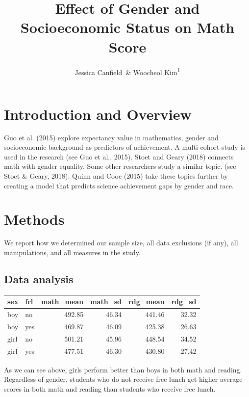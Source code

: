 \documentclass[man, fleqn, noextraspace,floatsintext]{apa6}
\title{Effect of Gender and Socioeconomic Status on Math Score}
\author{Jessica Canfield~\& Woocheol Kim\textsuperscript{1}}
\date{}
\affiliation{
\vspace{0.5cm}
\textsuperscript{1} University of Oregon}
\begin{document}
\maketitle

\hypertarget{introduction-and-overview}{%
\section{Introduction and Overview}\label{introduction-and-overview}}

Guo et al. (2015) explore expectancy value in mathematics, gender and socioeconomic background as predictors of achievement. A multi-cohort study is used in the research (see Guo et al., 2015). Stoet and Geary (2018) connects math with gender equality. Some other researchers study a similar topic. (see Stoet \& Geary, 2018). Quinn and Cooc (2015) take these topics further by creating a model that predicts science achievement gaps by gender and race.

\hypertarget{methods}{%
\section{Methods}\label{methods}}

We report how we determined our sample size, all data exclusions (if any), all manipulations, and all measures in the study.

\hypertarget{data-analysis}{%
\subsection{Data analysis}\label{data-analysis}}

\begin{table}[H]
\centering\begingroup\fontsize{15}{17}\selectfont

\begin{tabular}{l|l|r|r|r|r}
\hline
sex & frl & math\_mean & math\_sd & rdg\_mean & rdg\_sd\\
\hline
boy & no & 492.85 & 46.34 & 441.46 & 32.32\\
\hline
boy & yes & 469.87 & 46.09 & 425.38 & 26.63\\
\hline
girl & no & 501.21 & 45.96 & 448.54 & 34.52\\
\hline
girl & yes & 477.51 & 46.30 & 430.80 & 27.42\\
\hline
\end{tabular}
\endgroup{}
\end{table}

As we can see above, girls perform better than boys in both math and reading. Regardless of gender, students who do not receive free lunch get higher average scores in both math and reading than students who receive free lunch.
\end{document}

